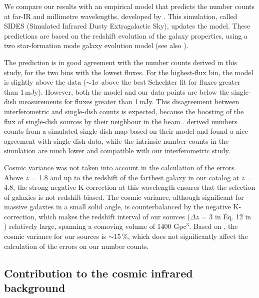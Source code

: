 \documentclass[longauth]{aa}
\begin{document}
We compare our results with an empirical model that predicts the number counts at far-IR and millimetre wavelengths, developed by \cite{Bethermin2017}. This simulation, called SIDES (Simulated Infrared Dusty Extragalactic Sky), updates the \cite{Bethermin2012} model. These predictions are based on the redshift evolution of the galaxy properties, using a two star-formation mode galaxy evolution model (see also \citealt{Sargent2012}).
 
The \cite{Bethermin2017} prediction is in good agreement with the number counts derived in this study, for the two bins with the lowest fluxes. For the highest-flux bin, the model is slightly above the data ($\sim$1$\sigma$ above the best Schechter fit for fluxes greater than 1\,mJy). However, both the \cite{Bethermin2017} model and our data points are below the single-dish measurements for fluxes greater than 1\,mJy. This disagreement between interferometric and single-dish counts is expected, because the boosting of the flux of single-dish sources by their neighbour in the beam \citep{Karim2013,Hodge2013,Scudder2016}. \cite{Bethermin2017} derived numbers counts from a simulated single-dish map based on their model and found a nice agreement with single-dish data, while the intrinsic number counts in the simulation are much lower and compatible with our interferometric study.

Cosmic variance was not taken into account in the calculation of the errors. Above $z$ = 1.8 and up to the redshift of the farthest galaxy in our catalog at $z$ = 4.8, the strong negative K-correction at this wavelength ensures that the selection of galaxies is not redshift-biased. The cosmic variance, although significant for massive galaxies in a small solid angle, is counterbalanced by the negative K-correction, which makes the redshift interval of our sources ($\Delta z$ = 3 in Eq. 12  in \citealt{Moster2011}) relatively large, spanning a comoving volume of 1400 Gpc$^3$. Based on \cite{Moster2011}, the cosmic variance for our sources is $\sim$15\,\%,  which does not significantly affect the calculation of the errors on our number counts.

\subsection{Contribution to the cosmic infrared background}
\end{document}
